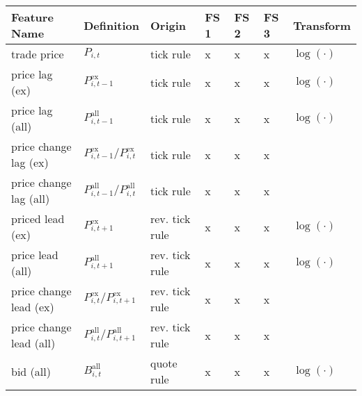 \begin{threeparttable}
    \begin{tabular}{@{}lllllll@{}}
        \toprule
        Feature Name            & Definition                                                                                       & Origin               & FS 1 & FS 2 & FS 3 & Transform     \\ \midrule
        trade price             & $P_{i, t}$                                                                                       & tick rule            & x    & x    & x    & $\log(\cdot)$ \\
        price lag (ex)          & $P_{i, t-1}^{\text{ex}}$\tnote{*}                                                                & tick rule            & x    & x    & x    & $\log(\cdot)$ \\
        price lag (all)         & $P_{i, t-1}^{\text{all}}$\tnote{*}                                                               & tick rule            & x    & x    & x    & $\log(\cdot)$ \\
        price change lag (ex)   & $P_{i, t-1}^{\text{ex}}/P_{i, t}^{\text{ex}}$\tnote{*}                                           & tick rule            & x    & x    & x    &               \\
        price change lag (all)  & $P_{i, t-1}^{\text{all}}/P_{i, t}^{\text{all}}$\tnote{*}                                         & tick rule            & x    & x    & x    &               \\
        priced lead (ex)        & $P_{i, t+1}^{\text{ex}}$\tnote{*}                                                                & rev. tick rule       & x    & x    & x    & $\log(\cdot)$ \\
        price lead (all)        & $P_{i, t+1}^{\text{all}}$\tnote{*}                                                               & rev. tick rule       & x    & x    & x    & $\log(\cdot)$ \\
        price change lead (ex)  & $P_{i, t}^{\text{ex}}/P_{i, t+1}^{\text{ex}}$\tnote{*}                                           & rev. tick rule       & x    & x    & x    &               \\
        price change lead (all) & $P_{i, t}^{\text{all}}/P_{i, t+1}^{\text{all}}$\tnote{*}                                         & rev. tick rule       & x    & x    & x    &               \\
        bid (all)               & $B_{i, t}^{\text{all}}$                                                                          & quote rule           & x    & x    & x    & $\log(\cdot)$ \\

\end{tabular}
\end{threeparttable}
